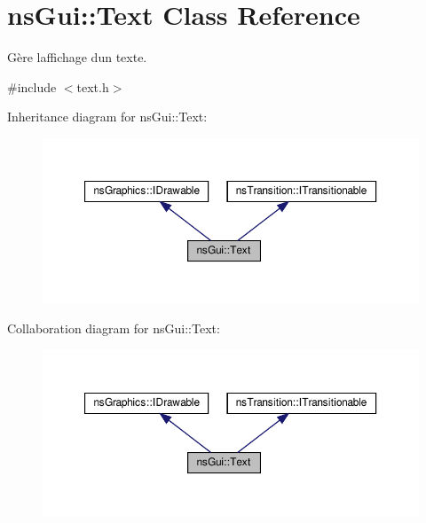 \hypertarget{classns_gui_1_1_text}{}\section{ns\+Gui\+:\+:Text Class Reference}
\label{classns_gui_1_1_text}


Gère l\textquotesingle{}affichage d\textquotesingle{}un texte.  




{\ttfamily \#include $<$text.\+h$>$}



Inheritance diagram for ns\+Gui\+:\+:Text\+:
\nopagebreak
\begin{figure}[H]
\begin{center}
\leavevmode
\includegraphics[width=350pt]{classns_gui_1_1_text__inherit__graph}
\end{center}
\end{figure}


Collaboration diagram for ns\+Gui\+:\+:Text\+:
\nopagebreak
\begin{figure}[H]
\begin{center}
\leavevmode
\includegraphics[width=350pt]{classns_gui_1_1_text__coll__graph}
\end{center}
\end{figure}
